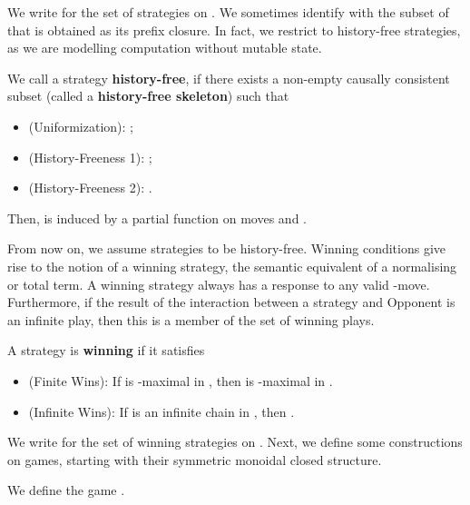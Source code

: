 \documentclass[runningheads,a4paper]{llncs}
\renewcommand{\emph}[1]{\textbf{#1}}
\begin{document}
We write  for the set of strategies on . We sometimes identify  with the subset of  that is obtained as its prefix closure. In fact, we restrict to history-free strategies, as we are modelling computation without mutable state. 
\begin{definition} We call a strategy  \emph{history-free}, if there exists a non-empty causally consistent subset  (called a \emph{history-free skeleton}) such that
\begin{itemize}\vspace{-6pt}
\item[] (Uniformization): ;
\item[] (History-Freeness 1): ;
\item[] (History-Freeness 2): .\vspace{-4pt}
\end{itemize}
Then,  is induced by a partial function on moves and .
\end{definition}
From now on, we assume strategies to be history-free. Winning conditions give rise to the notion of a winning strategy, the semantic equivalent of a normalising or total term. A winning strategy always has a response to any valid -move. Furthermore, if the result of the interaction between a strategy and Opponent is an infinite play, then this is a member of the set of winning plays.
\begin{definition}A strategy  is \emph{winning} if it satisfies
\begin{itemize}
\item[] (Finite Wins): If  is -maximal in , then  is -maximal in .
\item[] (Infinite Wins): If  is an infinite chain in , then .
\end{itemize}
\end{definition}
We write  for the set of winning strategies on .
Next, we define some constructions on games, starting with their symmetric monoidal closed structure.
\begin{definition} We define the game .\end{definition}
\end{document}
